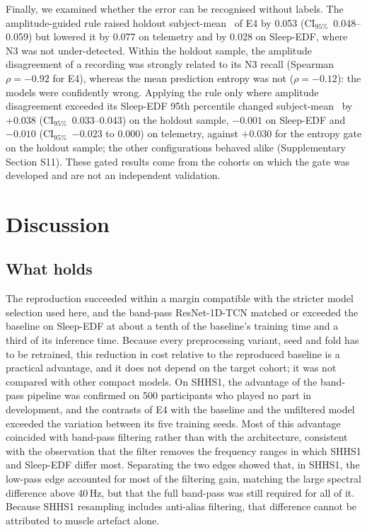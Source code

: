 \documentclass[11pt,a4paper]{article}
\newcommand{\mf}{\text{macro-F1}}
\newcommand{\ci}{\ensuremath{\mathrm{CI}_{95\%}}}
\begin{document}
Finally, we examined whether the error can be recognised without labels. The amplitude-guided rule
raised holdout subject-mean \mf\ of E4 by 0.053 (\ci\ 0.048--0.059) but lowered it by 0.077 on
telemetry and by 0.028 on Sleep-EDF, where N3 was not under-detected. Within the holdout sample, the
amplitude disagreement of a recording was strongly related to its N3 recall (Spearman $\rho=-0.92$
for E4), whereas the mean prediction entropy was not ($\rho=-0.12$): the models were confidently
wrong. Applying the rule only where amplitude disagreement exceeded its Sleep-EDF 95th percentile
changed subject-mean \mf\ by $+0.038$ (\ci\ 0.033--0.043) on the holdout sample, $-0.001$ on Sleep-EDF
and $-0.010$ (\ci\ $-0.023$ to 0.000) on telemetry, against $+0.030$ for the entropy gate on the
holdout sample; the other configurations behaved alike (Supplementary Section S11). These gated
results come from the cohorts on which the gate was developed and are not an independent
validation.

\section{Discussion}

\subsection{What holds}

The reproduction succeeded within a margin compatible with the stricter model selection used here, and
the band-pass ResNet-1D-TCN matched or exceeded the baseline on Sleep-EDF at about a tenth of the
baseline's training time and a third of its inference time. Because every preprocessing variant, seed
and fold has to be retrained, this reduction in cost relative to the reproduced baseline is a practical
advantage, and it does not depend on the target cohort; it was not compared with other compact models.
On SHHS1, the advantage of the band-pass pipeline was confirmed on 500 participants who played no part
in development, and the contrasts of E4 with the baseline and the unfiltered model exceeded the
variation between its five training seeds. Most of this advantage
coincided with band-pass filtering rather than with the architecture, consistent with the
observation that the filter removes the frequency ranges in which SHHS1 and Sleep-EDF differ most.
Separating the two edges showed that, in SHHS1, the low-pass edge accounted for most of the filtering
gain, matching the large spectral difference above 40\,Hz, but that the full band-pass was still
required for all of it. Because SHHS1 resampling includes anti-alias filtering, that difference cannot
be attributed to muscle artefact alone.
\end{document}
